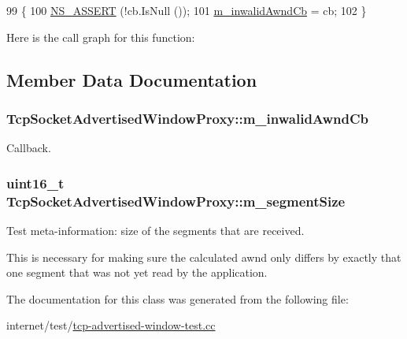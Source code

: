 \begin{DoxyCode}
99 \{
100   \hyperlink{assert_8h_a6dccdb0de9b252f60088ce281c49d052}{NS\_ASSERT} (!cb.IsNull ());
101   \hyperlink{classTcpSocketAdvertisedWindowProxy_abdfa0f5233b9dd93113a4ab6b192ddda}{m\_inwalidAwndCb} = cb;
102 \}
\end{DoxyCode}


Here is the call graph for this function\+:




\subsection{Member Data Documentation}
\subsubsection[{\texorpdfstring{m\+\_\+inwalid\+Awnd\+Cb}{m_inwalidAwndCb}}]{ Tcp\+Socket\+Advertised\+Window\+Proxy\+::m\+\_\+inwalid\+Awnd\+Cb\hspace{0.3cm}{\ttfamily [private]}}\hypertarget{classTcpSocketAdvertisedWindowProxy_abdfa0f5233b9dd93113a4ab6b192ddda}{}\label{classTcpSocketAdvertisedWindowProxy_abdfa0f5233b9dd93113a4ab6b192ddda}


Callback. 

\subsubsection[{\texorpdfstring{m\+\_\+segment\+Size}{m_segmentSize}}]{\setlength{\rightskip}{0pt plus 5cm}uint16\+\_\+t Tcp\+Socket\+Advertised\+Window\+Proxy\+::m\+\_\+segment\+Size\hspace{0.3cm}{\ttfamily [private]}}\hypertarget{classTcpSocketAdvertisedWindowProxy_a944bf6bd76de2dade1bfe634f06afa51}{}\label{classTcpSocketAdvertisedWindowProxy_a944bf6bd76de2dade1bfe634f06afa51}


Test meta-\/information\+: size of the segments that are received. 

This is necessary for making sure the calculated awnd only differs by exactly that one segment that was not yet read by the application. 

The documentation for this class was generated from the following file\+:\begin{DoxyCompactItemize}
\item 
internet/test/\hyperlink{tcp-advertised-window-test_8cc}{tcp-\/advertised-\/window-\/test.\+cc}\end{DoxyCompactItemize}
